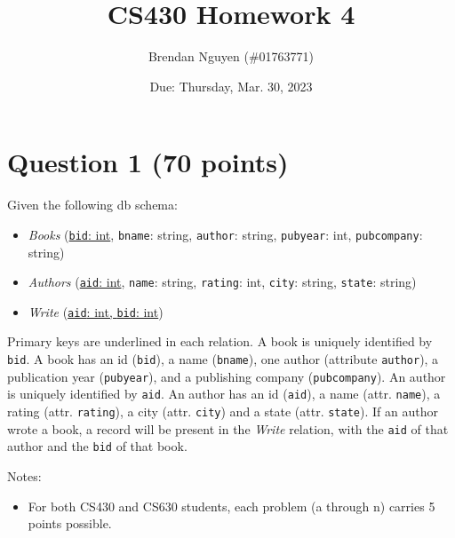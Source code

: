 \documentclass[letterpaper, 11pt]{article}
\title{CS430 Homework 4}
\author{Brendan Nguyen (\#01763771)}
\date{Due: Thursday, Mar. 30, 2023}
\begin{document}
\maketitle

\section*{Question 1 (70 points)}

Given the following db schema:
\begin{itemize}
    \item \textit{Books} (\ul{\texttt{bid}: int}, \texttt{bname}: string, \texttt{author}: string, \texttt{pubyear}: int, \texttt{pubcompany}: string)
    \item \textit{Authors} (\ul{\texttt{aid}: int}, \texttt{name}: string, \texttt{rating}: int, \texttt{city}: string, \texttt{state}: string)
    \item \textit{Write} (\ul{\texttt{aid}: int, \texttt{bid}: int})
\end{itemize}

Primary keys are underlined in each relation. A book is uniquely identified by \texttt{bid}. A book has an id (\texttt{bid}), a name (\texttt{bname}), one author (attribute \texttt{author}), a publication year (\texttt{pubyear}), and a publishing company (\texttt{pubcompany}). An author is uniquely identified by \texttt{aid}. An author has an id (\texttt{aid}), a name (attr. \texttt{name}), a rating (attr. \texttt{rating}), a city (attr. \texttt{city}) and a state (attr. \texttt{state}). If an author wrote a book, a record will be present in the \textit{Write} relation, with the \texttt{aid} of that author and the \texttt{bid} of that book. 

Notes:
\begin{itemize}
    \item For both CS430 and CS630 students, each problem (a through n) carries 5 points possible.
\end{itemize}
\end{document}
